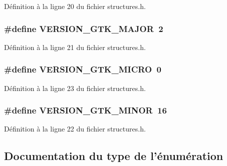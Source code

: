 Définition à la ligne 20 du fichier structures.h.

\subsubsection[{VERSION\_\-GTK\_\-MAJOR}]{\setlength{\rightskip}{0pt plus 5cm}\#define VERSION\_\-GTK\_\-MAJOR~2}\label{structures_8h_ad8e6c67206ef777067d2bad7f6d0cfe8}


Définition à la ligne 21 du fichier structures.h.

\subsubsection[{VERSION\_\-GTK\_\-MICRO}]{\setlength{\rightskip}{0pt plus 5cm}\#define VERSION\_\-GTK\_\-MICRO~0}\label{structures_8h_a1d2f4338aa44cc156bfcac60c7465a01}


Définition à la ligne 23 du fichier structures.h.

\subsubsection[{VERSION\_\-GTK\_\-MINOR}]{\setlength{\rightskip}{0pt plus 5cm}\#define VERSION\_\-GTK\_\-MINOR~16}\label{structures_8h_a2d31570fe40ad0097dd3b6312470eec2}


Définition à la ligne 22 du fichier structures.h.



\subsection{Documentation du type de l'énumération}
